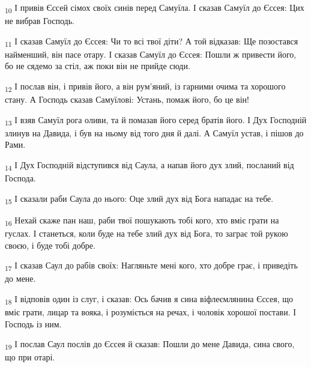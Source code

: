 \begin{tcolorbox}
\textsubscript{10} І привів Єссей сімох своїх синів перед Самуїла. І сказав Самуїл до Єссея: Цих не вибрав Господь.
\end{tcolorbox}
\begin{tcolorbox}
\textsubscript{11} І сказав Самуїл до Єссея: Чи то всі твої діти? А той відказав: Ще позостався найменший, він пасе отару. І сказав Самуїл до Єссея: Пошли ж привести його, бо не сядемо за стіл, аж поки він не прийде сюди.
\end{tcolorbox}
\begin{tcolorbox}
\textsubscript{12} І послав він, і привів його, а він рум'яний, із гарними очима та хорошого стану. А Господь сказав Самуїлові: Устань, помаж його, бо це він!
\end{tcolorbox}
\begin{tcolorbox}
\textsubscript{13} І взяв Самуїл рога оливи, та й помазав його серед братів його. І Дух Господній злинув на Давида, і був на ньому від того дня й далі. А Самуїл устав, і пішов до Рами.
\end{tcolorbox}
\begin{tcolorbox}
\textsubscript{14} І Дух Господній відступився від Саула, а напав його дух злий, посланий від Господа.
\end{tcolorbox}
\begin{tcolorbox}
\textsubscript{15} І сказали раби Саула до нього: Оце злий дух від Бога нападає на тебе.
\end{tcolorbox}
\begin{tcolorbox}
\textsubscript{16} Нехай скаже пан наш, раби твої пошукають тобі кого, хто вміє грати на гуслах. І станеться, коли буде на тебе злий дух від Бога, то заграє той рукою своєю, і буде тобі добре.
\end{tcolorbox}
\begin{tcolorbox}
\textsubscript{17} І сказав Саул до рабів своїх: Нагляньте мені кого, хто добре грає, і приведіть до мене.
\end{tcolorbox}
\begin{tcolorbox}
\textsubscript{18} І відповів один із слуг, і сказав: Ось бачив я сина віфлеємлянина Єссея, що вміє грати, лицар та вояка, і розуміється на речах, і чоловік хорошої постави. І Господь із ним.
\end{tcolorbox}
\begin{tcolorbox}
\textsubscript{19} І послав Саул послів до Єссея й сказав: Пошли до мене Давида, сина свого, що при отарі.
\end{tcolorbox}
